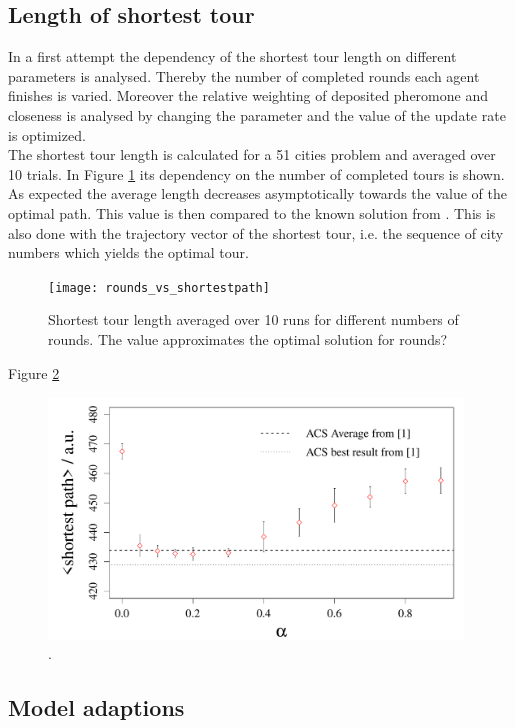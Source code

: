 

\subsection{Length of shortest tour}

In a first attempt the dependency of the shortest tour length on different parameters is analysed. Thereby the number of completed rounds each agent finishes is varied. Moreover the relative weighting of deposited pheromone and closeness is analysed by changing the parameter \beta and the value of the update rate \alpha is optimized. \\
The shortest tour length is calculated for a 51 cities problem and averaged over 10 trials. In Figure \ref{fig:roundsp} its dependency on the number of completed tours is shown. As expected the average length decreases asymptotically towards the value of the optimal path. This value is then compared to the known solution from \cite{web:data}. This is also done with the trajectory vector of the shortest tour, i.e. the sequence of city numbers which yields the optimal tour.

\begin{figure}[h!]
\begin{center}
\texttt{[image: rounds\_vs\_shortestpath]}
\caption{Shortest tour length averaged over 10 runs for different numbers of rounds. The value approximates the optimal solution for  rounds?}
\label{fig:roundsp}
\end{center}
\end{figure}
Figure \ref{fig:alphasp}
\begin{figure}[h!]
\begin{center}
\includegraphics[width=11cm, height= 6 cm]{alpha_vs_shortestpath}
\caption{.}
\label{fig:alphasp}
\end{center}
\end{figure}

\subsection{Model adaptions}


